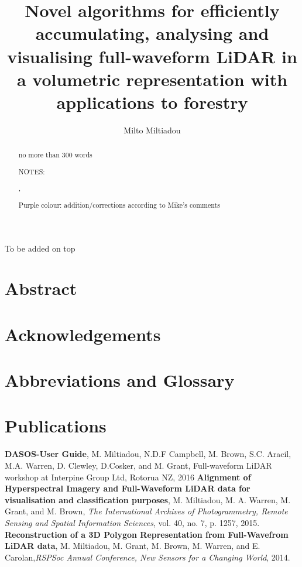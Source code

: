 \documentclass[11pt,nofootinbib]{report}
\title{ Novel algorithms for efficiently accumulating, analysing and visualising full-waveform LiDAR in a volumetric representation with applications to forestry}
\author{Milto Miltiadou}
\begin{document}
	\maketitle
 		
\begin{abstract}	
     no more than 300 words
     
     NOTES:
     \par {\color{blue}{Blue colour: additions according to Neill's feedback}},
     \par {\color{Fuchsia} Purple colour: addition/corrections according to Mike's comments }
     \par {\color{red}{Red colour: notes}}
     \par {\color{gray}{Gray colour: text that is going to be modified }}
     
     \thispagestyle{empty}
\end{abstract}

\newpage
\thispagestyle{empty}
	\setcounter{secnumdepth}{0}
	To be added on top
	\section{Abstract}\label{Abstract}
		
		\thispagestyle{empty}
		\newpage
	\section{Acknowledgements}\label{Acknowledgments}
		
		\thispagestyle{empty}
		\newpage
	

	\section {Abbreviations and Glossary}\label{Abbreviations}
	
	\newpage
	\section{Publications}
		\textbf{DASOS-User Guide}, M. Miltiadou, N.D.F Campbell, M. Brown, S.C. Aracil, M.A. Warren, D. Clewley, D.Cosker, and M. Grant, Full-waveform LiDAR workshop at Interpine Group Ltd, Rotorua NZ, 2016\newline
		\textbf{Alignment of Hyperspectral Imagery and Full-Waveform LiDAR data for visualisation and classification purposes}, M. Miltiadou, M. A. Warren, M. Grant, and M. Brown, \textit{The International Archives of Photogrammetry, Remote Sensing and Spatial Information Sciences}, vol. 40, no. 7, p. 1257, 2015.\newline
		\textbf{Reconstruction of a 3D Polygon Representation from Full-Wavefrom LiDAR data}, M. Miltiadou, M. Grant, M. Brown, M. Warren, and E. Carolan,\textit{RSPSoc Annual Conference, New Sensors for a Changing World}, 2014.\newline
	 
\end{document}
